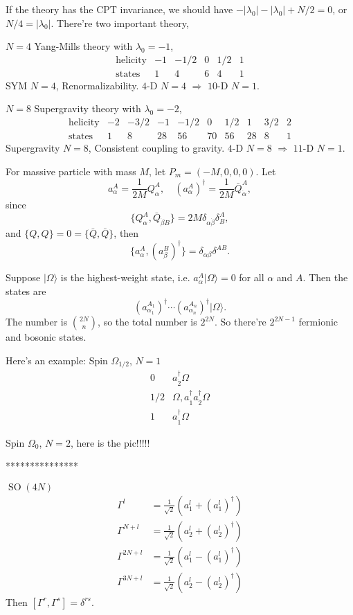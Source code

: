 \documentclass[11pt]{article}
\theoremstyle{definition}
\theoremstyle{plain}
\begin{document}
If the theory has the CPT invariance, we should have $-|\lambda_0|-|\lambda_0|+N/2=0$, or $N/4=|\lambda_0|$. There're two important theory,
\begin{compactenum}[(1)]
\item $N=4$ Yang-Mills theory with $\lambda_0=-1$,
\[
\begin{matrix}
\text{helicity}& -1 & -1/2 & 0 & 1/2 & 1\\
\text{states}& 1 & 4 & 6 & 4 & 1
\end{matrix}
\]
SYM $N=4$, Renormalizability. $4$-D $N=4$ $\Rightarrow$ $10$-D $N=1$.

\item $N=8$ Supergravity theory with $\lambda_0=-2$,
\[
\begin{matrix}
\text{helicity}&-2 & -3/2 & -1 & -1/2 & 0 & 1/2 & 1 & 3/2 & 2\\
\text{states}& 1 & 8 & 28 & 56 & 70 & 56 & 28 & 8 & 1
\end{matrix}
\]
Supergravity $N=8$, Consistent coupling to gravity. 
$4$-D $N=8$ $\Rightarrow$ $11$-D $N=1$.
\end{compactenum}

For massive particle with mass $M$, let $P_m=(-M,0,0,0)$. Let
\[
	a_\alpha^A=\frac{1}{2M}Q_\alpha^A,\quad (a_\alpha^A)^\dag=\frac{1}{2M}\bar Q_{\dot \alpha}^A,
\]
since
\[
	\{Q_\alpha^A,\bar Q_{\dot\beta B}\}=2M \delta_{\alpha\dot \beta}\delta^A_B,
\]
and $\{Q,Q\}=0=\{\bar Q,\bar Q\}$, then
\[
	\{a_\alpha^A,(a_{\beta}^B)^\dagger \}=\delta_{\alpha\beta}\delta^{AB}.
\]

Suppose $|\Omega\rangle$ is the highest-weight state, i.e. $a_\alpha^A|\Omega\rangle =0$ for all $\alpha$ and $A$. Then the states are
\[
	(a^{A_1}_{\alpha_1})^\dagger \cdots (a^{A_n}_{\alpha_n})^\dagger |\Omega\rangle.
\]
The number is $\binom{2N}{n}$,
so the total number is $2^{2N}$. So there're $2^{2N-1}$ fermionic and 
bosonic states.

Here's an example: Spin $\Omega_{1/2}$, $N=1$
\[
	\begin{matrix}
	0& a_{\dot 2}^\dagger\Omega\\
	1/2 & \Omega, a_{\dot 1}^\dagger a_{\dot 2}^\dagger\Omega\\
	1 & a_{\dot 1}^\dagger\Omega
	\end{matrix}
\]

Spin $\Omega_0$, $N=2$, here is the pic!!!!!

***************

$\operatorname{SO}(4N)$
\begin{align*}
	\Gamma^l&=\frac{1}{\sqrt 2}(a_1^l+(a_1^l)^\dagger)\\
	\Gamma^{N+l}&=\frac{1}{\sqrt 2}(a_2^l+(a_2^l)^\dagger)\\
	\Gamma^{2N+l}&=\frac{1}{\sqrt 2}(a_1^l-(a_1^l)^\dagger)\\
	\Gamma^{3N+l}&=\frac{1}{\sqrt 2}(a_2^l-(a_2^l)^\dagger)
\end{align*}
Then $[\Gamma^r,\Gamma^s]=\delta^{rs}$.
\end{document}
